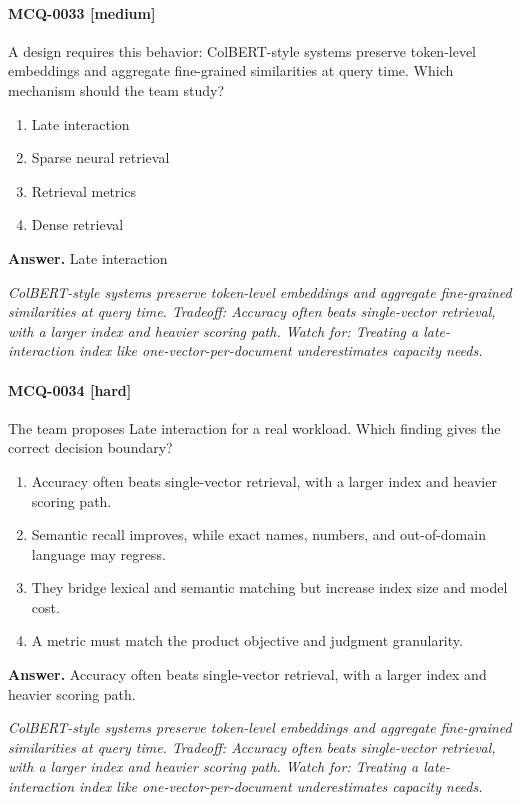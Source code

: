 \paragraph{MCQ-0033 [medium]} A design requires this behavior: ColBERT-style systems preserve token-level embeddings and aggregate fine-grained similarities at query time. Which mechanism should the team study?
\begin{enumerate}[label=\Alph*.]
\item Late interaction
\item Sparse neural retrieval
\item Retrieval metrics
\item Dense retrieval
\end{enumerate}
\noindent\textbf{Answer.} Late interaction
\par\textit{ColBERT-style systems preserve token-level embeddings and aggregate fine-grained similarities at query time. Tradeoff: Accuracy often beats single-vector retrieval, with a larger index and heavier scoring path. Watch for: Treating a late-interaction index like one-vector-per-document underestimates capacity needs.}
\paragraph{MCQ-0034 [hard]} The team proposes Late interaction for a real workload. Which finding gives the correct decision boundary?
\begin{enumerate}[label=\Alph*.]
\item Accuracy often beats single-vector retrieval, with a larger index and heavier scoring path.
\item Semantic recall improves, while exact names, numbers, and out-of-domain language may regress.
\item They bridge lexical and semantic matching but increase index size and model cost.
\item A metric must match the product objective and judgment granularity.
\end{enumerate}
\noindent\textbf{Answer.} Accuracy often beats single-vector retrieval, with a larger index and heavier scoring path.
\par\textit{ColBERT-style systems preserve token-level embeddings and aggregate fine-grained similarities at query time. Tradeoff: Accuracy often beats single-vector retrieval, with a larger index and heavier scoring path. Watch for: Treating a late-interaction index like one-vector-per-document underestimates capacity needs.}
